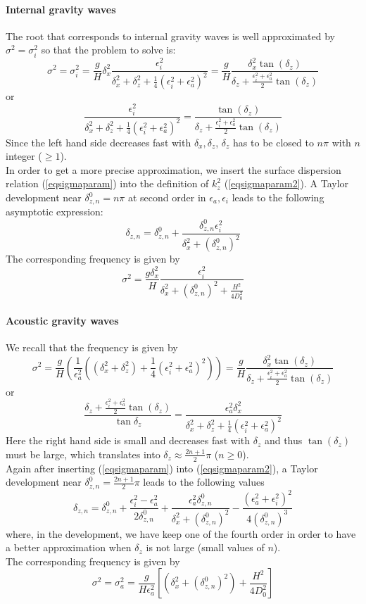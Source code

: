 \paragraph{Internal gravity waves}
The root that corresponds to internal gravity waves is well approximated by $\sigma^2=\sigma_i^2$ so that the problem to solve is:
\[
\sigma^2=\sigma_i^2=\frac{g}{H}\delta_x^2\frac{\epsilon_i^2}{\delta_x^2+\delta_z^2+\frac{1}{4}\left(
\epsilon_i^2+\epsilon_a^2
\right)^2}=\frac{g}{H}\frac{\delta_x^2\tan(\delta_z)}{\delta_z+\frac{\epsilon_i^2+\epsilon_a^2}{2}\tan(\delta_z)}
\]
or
\[
\frac{\epsilon_i^2}{\delta_x^2+\delta_z^2+\frac{1}{4}\left(
\epsilon_i^2+\epsilon_a^2
\right)^2}=\frac{\tan(\delta_z)}{\delta_z+\frac{\epsilon_i^2+\epsilon_a^2}{2}\tan(\delta_z)}
\]
Since the left hand side decreases fast with $\delta_x, \delta_z$, $\delta_z$ has to be closed to $n\pi$ with $n$ integer ($\ge 1$).\\
In order to get a more precise approximation, we insert the surface dispersion relation (\ref{eqsigmaparam}) into the definition of $k_z^2$ (\ref{eqsigmaparam2}).
A Taylor development near $\delta_{z,n}^0=n\pi$ at second order in $\epsilon_a, \epsilon_i$ leads to the following asymptotic expression:
\[
\delta_{z,n}=\delta_{z,n}^0+\frac{\delta_{z,n}^0\epsilon_i^2}{\delta_x^2+(\delta_{z,n}^0)^2}
\]
The corresponding frequency is given by
\[
\sigma^2=
\frac{g \delta_x^2}{H}\frac{\epsilon_i^2}{\delta_x^2+(\delta_{z,n}^0)^2+\frac{H^2}{4D_0^2}}
\]
\paragraph{Acoustic gravity waves}
We recall that the frequency is given by
\[
\sigma^2=\frac{g}{H}\left(
\frac{1}{\epsilon_a^2}\left(
\left(\delta_x^2+\delta_z^2\right)
+\frac{1}{4}\left(
\epsilon_i^2+\epsilon_a^2
\right)^2
\right)
\right)=
\frac{g}{H}\frac{\delta_x^2\tan(\delta_z)}{\delta_z+\frac{\epsilon_i^2+\epsilon_a^2}{2}\tan(\delta_z)}
\]
or
\[
\frac{\delta_z+\frac{\epsilon_i^2+\epsilon_a^2}{2}\tan(\delta_z)}{\tan{\delta_z}}=\frac{\epsilon_a^2 \delta_x^2}{\delta_x^2+\delta_z^2
+\frac{1}{4}\left(
\epsilon_i^2+\epsilon_a^2
\right)^2}
\]
Here the right hand side is small and decreases fast with $\delta_z$ and thus
$\tan{(\delta_z)}$ must be large, which translates into $\delta_z\approx \frac{2n+1}{2}\pi$ ($n\ge 0$).\\
Again after inserting (\ref{eqsigmaparam}) into (\ref{eqsigmaparam2}), a Taylor development near $\delta_{z,n}^0=\frac{2n+1}{2}\pi$ leads to the following values
\[
\delta_{z,n}=\delta_{z,n}^0+\frac{\epsilon_i^2-\epsilon_a^2}{2\delta_{z,n}^0}
+\frac{\epsilon_a^2\delta_{z,n}^0}{\delta_x^2+(\delta_{z,n}^0)^2}
-\frac{\left(\epsilon_a^2+\epsilon_i^2\right)^2}{4(\delta_{z,n}^0)^3}
\]
where, in the development, we have keep one of the fourth order in order to have a better approximation when $\delta_z$ is not large (small values of $n$).\\
The corresponding frequency is given by
\[
\sigma^2=
\sigma_a^2=\frac{g}{H\epsilon_a^2}\left[
\left(\delta_x^2+(\delta_{z,n}^0)^2\right)
+\frac{H^2}{4D_0^2}
\right]
\]
